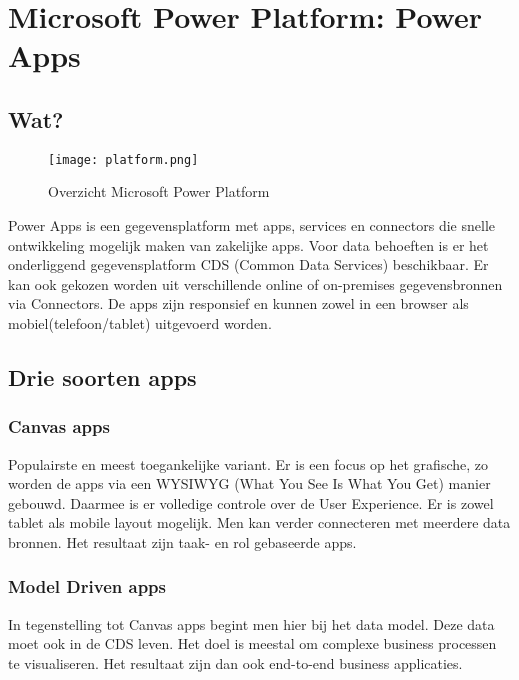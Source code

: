 \section{Microsoft Power Platform: Power Apps}
\label{sec:power-platform}

\subsection{Wat?}

\begin{figure}[h!]
    \texttt{[image: platform.png]}
    \caption{Overzicht Microsoft Power Platform \autocite{MicrosoftDocs2019a}}
    \label{fig:mspowerplatform}
\end{figure}

Power Apps is een gegevensplatform met apps, services en connectors die snelle ontwikkeling mogelijk maken van zakelijke apps. Voor data behoeften is er het onderliggend gegevensplatform CDS (Common Data Services) beschikbaar. Er kan ook gekozen worden uit verschillende online of on-premises gegevensbronnen via Connectors. De apps zijn responsief en kunnen zowel in een browser als mobiel(telefoon/tablet) uitgevoerd worden. \autocite{MicrosoftDocs2019}

\subsection{Drie soorten apps}

\subsubsection{Canvas apps}

Populairste en meest toegankelijke variant. Er is een focus op het grafische, zo worden de apps via een WYSIWYG (What You See Is What You Get) manier gebouwd. Daarmee is er volledige controle over de User Experience. Er is zowel tablet als mobile layout mogelijk. Men kan verder connecteren met meerdere data bronnen. Het resultaat zijn taak- en rol gebaseerde apps. \autocite{PragmaticWorks2019}

\subsubsection{Model Driven apps}

In tegenstelling tot Canvas apps begint men hier bij het data model. Deze data moet ook in de CDS leven. Het doel is meestal om complexe business processen te visualiseren. Het resultaat zijn dan ook end-to-end business applicaties. \autocite{PragmaticWorks2019}


